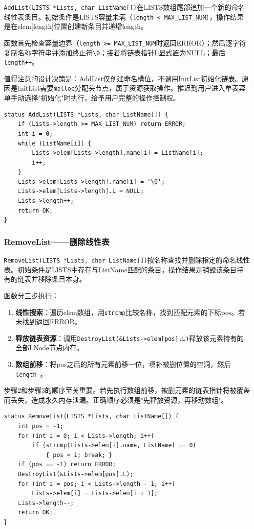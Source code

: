 \documentclass[supercite]{Experimental_Report}
\begin{document}
\texttt{AddList(LISTS *Lists, char ListName[])}在LISTS数组尾部追加一个新的命名线性表条目。初始条件是LISTS容量未满（\texttt{length < MAX\_LIST\_NUM}），操作结果是在elem[length]位置创建新条目并递增length。

函数首先检查容量边界（\texttt{length >= MAX\_LIST\_NUM}时返回ERROR）；然后逐字符复制名称字符串并添加终止符\texttt{\textbackslash0}；接着将链表指针L显式置为NULL；最后\texttt{length++}。

值得注意的设计决策是：AddList仅创建命名槽位，不调用InitList初始化链表。原因是InitList需要\texttt{malloc}分配头节点，属于资源获取操作。推迟到用户进入单表菜单手动选择"初始化"时执行，给予用户完整的操作控制权。

\begin{lstlisting}[caption={AddList函数}]
status AddList(LISTS *Lists, char ListName[]) {
    if (Lists->length >= MAX_LIST_NUM) return ERROR;
    int i = 0;
    while (ListName[i]) {
        Lists->elem[Lists->length].name[i] = ListName[i];
        i++;
    }
    Lists->elem[Lists->length].name[i] = '\0';
    Lists->elem[Lists->length].L = NULL;
    Lists->length++;
    return OK;
}
\end{lstlisting}

\subsubsection{RemoveList——删除线性表}

\texttt{RemoveList(LISTS *Lists, char ListName[])}按名称查找并删除指定的命名线性表。初始条件是LISTS中存在与ListName匹配的条目，操作结果是销毁该条目持有的链表并移除条目本身。

函数分三步执行：

\begin{enumerate}
    \item \textbf{线性搜索}：遍历elem数组，用\texttt{strcmp}比较名称，找到匹配元素的下标pos。若未找到返回ERROR。
    \item \textbf{释放链表资源}：调用\texttt{DestroyList(\&Lists->elem[pos].L)}释放该元素持有的全部LNode节点内存。
    \item \textbf{数组前移}：将pos之后的所有元素前移一位，填补被删位置的空洞，然后\texttt{length--}。
\end{enumerate}

步骤2和步骤3的顺序至关重要。若先执行数组前移，被删元素的链表指针将被覆盖而丢失，造成永久内存泄漏。正确顺序必须是"先释放资源，再移动数组"。

\begin{lstlisting}[caption={RemoveList函数}]
status RemoveList(LISTS *Lists, char ListName[]) {
    int pos = -1;
    for (int i = 0; i < Lists->length; i++)
        if (strcmp(Lists->elem[i].name, ListName) == 0)
            { pos = i; break; }
    if (pos == -1) return ERROR;
    DestroyList(&Lists->elem[pos].L);
    for (int i = pos; i < Lists->length - 1; i++)
        Lists->elem[i] = Lists->elem[i + 1];
    Lists->length--;
    return OK;
}
\end{lstlisting}
\end{document}

